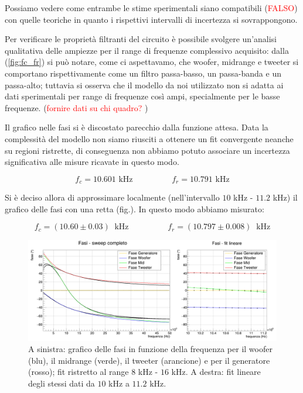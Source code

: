\documentclass[12pt,italian]{article}
\newcommand{\err}[1]{\textcolor{red}{#1}}
\begin{document}
\noindent
Possiamo vedere come entrambe le stime sperimentali siano compatibili
(\err{FALSO}) con quelle teoriche in quanto i rispettivi intervalli di
incertezza si sovrappongono.

Per verificare le proprietà filtranti del circuito è possibile svolgere
un'analisi qualitativa delle ampiezze per il range di frequenze complessivo
acquisito: dalla (\cref{fig:fc_fr}) si può notare, come ci aspettavamo, che
woofer, midrange e tweeter si comportano rispettivamente come un filtro
passa-basso, un passa-banda e un passa-alto; tuttavia si osserva che il modello
da noi utilizzato non si adatta ai dati sperimentali per range di frequenze
così ampi, specialmente per le basse frequenze. (\err{fornire dati su chi
	quadro? })

Il grafico nelle fasi si è discostato parecchio dalla funzione attesa. Data la
complessità del modello non siamo riusciti a ottenere un fit convergente
neanche su regioni ristrette, di conseguenza non abbiamo potuto associare un
incertezza significativa alle misure ricavate in questo modo.

\begin{equation*}
	f_{c} = 10.601 \text{ kHz} \hspace{2cm} f_{r} = 10.791 \text{ kHz}
\end{equation*}

Si è deciso allora di approssimare localmente (nell'intervallo $10$ kHz -
$11.2$ kHz) il grafico delle fasi con una retta (fig.). In questo modo abbiamo
misurato:

\begin{equation*}
	f_{c} = (10.60 \pm 0.03)\  \text{ kHz} \hspace{2cm}	f_{r} = (10.797 \pm 0.008)\  \text{ kHz}
\end{equation*}

\begin{figure}[h]
	\centering
	\includegraphics[width=\textwidth]{fig_fase.png}
	\caption{A sinistra: grafico delle fasi in funzione della frequenza per il woofer
		(blu), il midrange (verde), il tweeter (arancione) e per il generatore (rosso);
		fit ristretto al range $8$ kHz - $16$ kHz. A destra: fit lineare degli stessi dati da $10$ kHz a $11.2$ kHz.}\label{fig:phase_sweep}
\end{figure}
\end{document}

